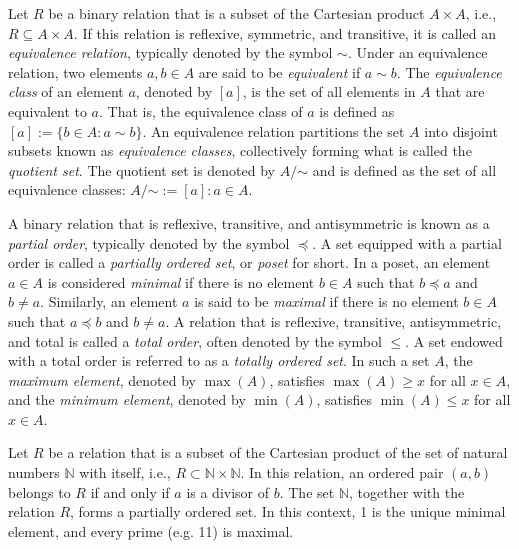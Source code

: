 Let $R$ be a binary relation that is a subset of the Cartesian product $A \times A$, i.e., $R \subseteq A \times A$. If this relation is reflexive, symmetric, and transitive, it is called an \emph{equivalence relation}, typically denoted by the symbol $\sim$. Under an equivalence relation, two elements $a, b \in A$ are said to be \emph{equivalent} if $a \sim b$. The \emph{equivalence class} of an element $a$, denoted by $[a]$, is the set of all elements in $A$ that are equivalent to $a$. That is, the equivalence class of $a$ is defined as $[a] := \{ b \in A : a \sim b \}$. An equivalence relation partitions the set $A$ into disjoint subsets known as \emph{equivalence classes}, collectively forming what is called the \emph{quotient set}. The quotient set is denoted by $A / {\mathord {\sim }}$ and is defined as the set of all equivalence classes: $A / {\mathord {\sim }} := { [a] : a \in A }$.

A binary relation that is reflexive, transitive, and antisymmetric is known as a \emph{partial order}, typically denoted by the symbol $\preceq$. A set equipped with a partial order is called a \emph{partially ordered set}, or \emph{poset} for short. In a poset, an element $a \in A$ is considered \emph{minimal} if there is no element $b \in A$ such that $b \preceq a$ and $b \neq a$. Similarly, an element $a$ is said to be \emph{maximal} if there is no element $b \in A$ such that $a \preceq b$ and $b \neq a$. A relation that is reflexive, transitive, antisymmetric, and total is called a \emph{total order}, often denoted by the symbol $\leq$. A set endowed with a total order is referred to as a \emph{totally ordered set}. In such a set $A$, the \emph{maximum element}, denoted by $\max(A)$, satisfies $\max(A) \geq x$ for all $x \in A$, and the \emph{minimum element}, denoted by $\min(A)$, satisfies $\min(A) \leq x$ for all $x \in A$.

\begin{example}
Let $R$ be a relation that is a subset of the Cartesian product of the set of natural numbers $\mathbb{N}$ with itself, i.e., $R \subset \mathbb{N} \times \mathbb{N}$. In this relation, an ordered pair $(a, b)$ belongs to $R$ if and only if $a$ is a divisor of $b$. The set $\mathbb{N}$, together with the relation $R$, forms a partially ordered set. In this context, 1 is the unique minimal element, and every prime (e.g. 11) is maximal.
\end{example}


